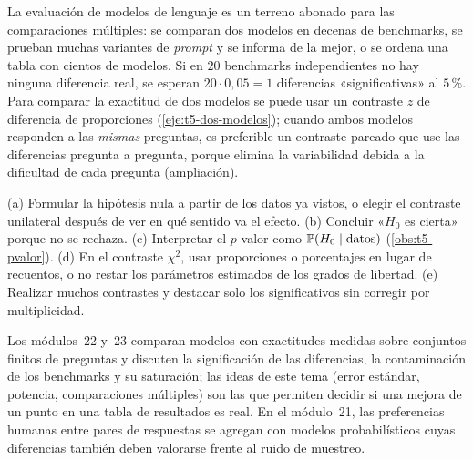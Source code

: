 \begin{observacion}\label{obs:t5-benchmarks}
La evaluación de modelos de lenguaje es un terreno abonado para las comparaciones múltiples: se comparan dos modelos en decenas de benchmarks, se prueban muchas variantes de \emph{prompt} y se informa de la mejor, o se ordena una tabla con cientos de modelos. Si en $20$ benchmarks independientes no hay ninguna diferencia real, se esperan $20\cdot0{,}05=1$ diferencias «significativas» al $5\,\%$. Para comparar la exactitud de dos modelos se puede usar un contraste $z$ de diferencia de proporciones (\cref{eje:t5-dos-modelos}); cuando ambos modelos responden a las \emph{mismas} preguntas, es preferible un contraste pareado que use las diferencias pregunta a pregunta, porque elimina la variabilidad debida a la dificultad de cada pregunta (ampliación).
\end{observacion}

\begin{observacion}\label{obs:t5-errores}
(a) Formular la hipótesis nula a partir de los datos ya vistos, o elegir el contraste unilateral después de ver en qué sentido va el efecto.
(b) Concluir «$H_0$ es cierta» porque no se rechaza.
(c) Interpretar el $p$-valor como $\mathbb{P}(H_0\mid\text{datos})$ (\cref{obs:t5-pvalor}).
(d) En el contraste $\chi^{2}$, usar proporciones o porcentajes en lugar de recuentos, o no restar los parámetros estimados de los grados de libertad.
(e) Realizar muchos contrastes y destacar solo los significativos sin corregir por multiplicidad.
\end{observacion}

\begin{observacion}
Los módulos~22 y~23 comparan modelos con exactitudes medidas sobre conjuntos finitos de preguntas y discuten la significación de las diferencias, la contaminación de los benchmarks y su saturación; las ideas de este tema (error estándar, potencia, comparaciones múltiples) son las que permiten decidir si una mejora de un punto en una tabla de resultados es real. En el módulo~21, las preferencias humanas entre pares de respuestas se agregan con modelos probabilísticos cuyas diferencias también deben valorarse frente al ruido de muestreo.
\end{observacion}

